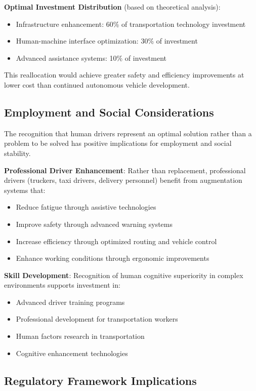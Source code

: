 \documentclass[12pt,a4paper]{article}
\begin{document}
\textbf{Optimal Investment Distribution} (based on theoretical analysis):
\begin{itemize}
\item Infrastructure enhancement: 60\% of transportation technology investment
\item Human-machine interface optimization: 30\% of investment
\item Advanced assistance systems: 10\% of investment
\end{itemize}

This reallocation would achieve greater safety and efficiency improvements at lower cost than continued autonomous vehicle development.

\subsection{Employment and Social Considerations}

The recognition that human drivers represent an optimal solution rather than a problem to be solved has positive implications for employment and social stability.

\textbf{Professional Driver Enhancement}:
Rather than replacement, professional drivers (truckers, taxi drivers, delivery personnel) benefit from augmentation systems that:
\begin{itemize}
\item Reduce fatigue through assistive technologies
\item Improve safety through advanced warning systems
\item Increase efficiency through optimized routing and vehicle control
\item Enhance working conditions through ergonomic improvements
\end{itemize}

\textbf{Skill Development}:
Recognition of human cognitive superiority in complex environments supports investment in:
\begin{itemize}
\item Advanced driver training programs
\item Professional development for transportation workers
\item Human factors research in transportation
\item Cognitive enhancement technologies
\end{itemize}

\subsection{Regulatory Framework Implications}
\end{document}
